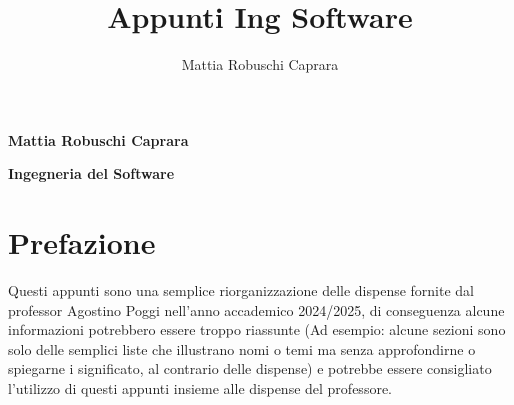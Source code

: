 \documentclass{article}
\title{Appunti Ing Software}
\author{Mattia Robuschi Caprara}
\date{}
\begin{document}
	
	\begin{titlepage}
		
		\pagecolor{CoverGreen}
		
		\vspace{25 mm}
		\begin{center}
			\large
			{\color{black}\textbf{Mattia Robuschi Caprara}} 
		\end{center}
		
		\begin{center}
			\huge
			{\color{black}\textbf{Ingegneria del Software}}
		\end{center}
		
		\vspace{45 mm}
		
		\begin{figure}[h]
			\centering
			\label{fig:cover}
		\end{figure}
		
		\thispagestyle{empty} 
	\end{titlepage}
	
	\newpage
	\pagecolor{white}
	\section*{Prefazione}
	Questi appunti sono una semplice riorganizzazione delle dispense fornite dal professor Agostino Poggi nell'anno accademico 2024/2025, di conseguenza alcune informazioni potrebbero essere troppo riassunte (Ad esempio: alcune sezioni sono solo delle semplici liste che illustrano nomi o temi ma senza approfondirne o spiegarne i significato, al contrario delle dispense) e potrebbe essere consigliato l'utilizzo di questi appunti insieme alle dispense del professore.
	\tableofcontents
	\newpage
	
\end{document}
